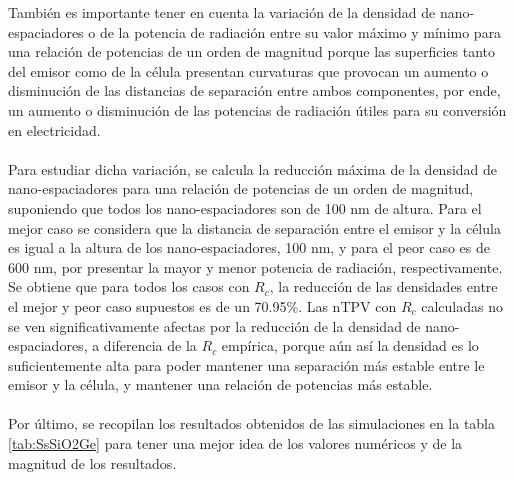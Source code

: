También es importante tener en cuenta la variación de la densidad de nano-espaciadores o de la potencia de radiación entre su valor máximo y mínimo para una relación de potencias de un orden de magnitud porque las superficies tanto del emisor como de la célula presentan curvaturas que provocan un aumento o disminución de las distancias de separación entre ambos componentes, por ende, un aumento o disminución de las potencias de radiación útiles para su conversión en electricidad.\\\\
Para estudiar dicha variación, se calcula la reducción máxima de la densidad de nano-espaciadores para una relación de potencias de un orden de magnitud, suponiendo que todos los nano-espaciadores son de 100 nm de altura. Para el mejor caso se considera que la distancia de separación entre el emisor y la célula es igual a la altura de los nano-espaciadores, 100 nm, y para el peor caso es de 600 nm, por presentar la mayor y menor potencia de radiación, respectivamente.
Se obtiene que para todos los casos con $R_c$, la reducción de las densidades entre el mejor y peor caso supuestos es de un 70.95\%. Las nTPV con $R_c$ calculadas no se ven significativamente afectas por la reducción de la densidad de nano-espaciadores, a diferencia de la $R_c$ empírica, porque aún así la densidad es lo suficientemente alta para poder mantener una separación más estable entre le emisor y la célula, y mantener una relación de potencias más estable.\\\\
Por último, se recopilan los resultados obtenidos de las simulaciones en la tabla \ref{tab:SsSiO2Ge} para tener una mejor idea de los valores numéricos y de la magnitud de los resultados.
